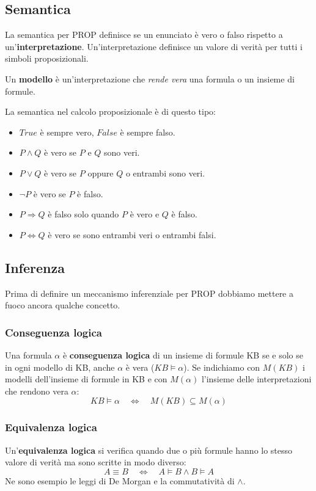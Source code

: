 \subsection{Semantica}
La semantica per PROP definisce se un enunciato \`e vero o falso rispetto a un'\textbf{interpretazione}. Un'interpretazione definisce
un valore di verit\`a per tutti i simboli proposizionali.

Un \textbf{modello} \`e un'interpretazione che \emph{rende vera} una formula o un insieme di formule.

La semantica nel calcolo proposizionale \`e di questo tipo:
\begin{itemize}
	\item $True$ \`e sempre vero, $False$ \`e sempre falso.
	\item $P \wedge Q$ \`e vero se $P$ e $Q$ sono veri.
	\item $P \vee Q$ \`e vero se $P$ oppure $Q$ o entrambi sono veri.
	\item $\lnot P$ \`e vero se $P$ \`e falso.
	\item $P \Rightarrow Q$ \`e falso solo quando $P$ \`e vero e $Q$ \`e falso.
	\item $P \Leftrightarrow Q$ \`e vero se sono entrambi veri o entrambi falsi.
\end{itemize}

\subsection{Inferenza}
Prima di definire un meccanismo inferenziale per PROP dobbiamo mettere a fuoco ancora qualche concetto.

\subsubsection{Conseguenza logica}
Una formula $\alpha$ \`e \textbf{conseguenza logica} di un insieme di formule KB se e solo se in ogni modello di KB,
anche $\alpha$ \`e vera ($KB \models \alpha$). Se indichiamo con $M(KB)$ i modelli dell'insieme di formule in KB e
con $M(\alpha)$ l'insieme delle interpretazioni che rendono vera $\alpha$:
\[ KB \models \alpha \quad \Leftrightarrow \quad M(KB) \subseteq M(\alpha) \]

\subsubsection{Equivalenza logica}
Un'\textbf{equivalenza logica} si verifica quando due o pi\`u formule hanno lo stesso valore di verit\`a ma sono scritte
in modo diverso:
\[ A \equiv B \quad \Leftrightarrow \quad A \models B \wedge B \models A \]
Ne sono esempio le leggi di De Morgan e la commutativit\`a di $\wedge$.

